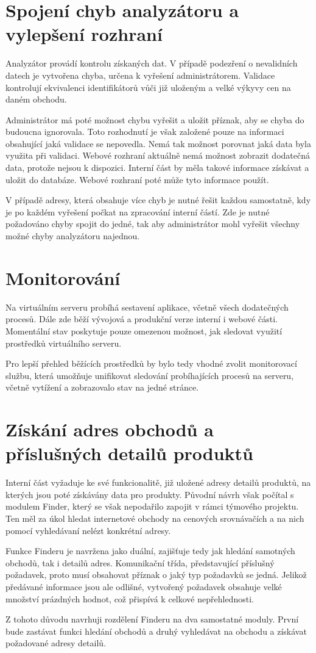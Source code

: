 \documentclass[thesis=B,czech]{FITthesis}[2012/06/26]
\begin{document}
\section{Spojení chyb analyzátoru a vylepšení rozhraní} \label{analyser-join}
Analyzátor provádí kontrolu získaných dat. V případě podezření o nevalidních datech je vytvořena chyba, určena k vyřešení
administrátorem. Validace kontrolují ekvivalenci identifikátorů vůči již uloženým a velké výkyvy cen na daném obchodu.
\par
Administrátor má poté možnost chybu vyřešit a uložit příznak, aby se chyba do budoucna ignorovala. Toto rozhodnutí je však
založené pouze na informaci obsahující jaká validace se nepovedla. Nemá tak možnost porovnat jaká data byla využita při validaci.
Webové rozhraní aktuálně nemá možnost zobrazit dodatečná data, protože nejsou k dispozici. Interní část by měla takové informace
získávat a uložit do databáze. Webové rozhraní poté může tyto informace použít.
\par
V případě adresy, která obsahuje více chyb je nutné řešit každou samostatně, kdy je po každém vyřešení počkat na zpracování interní částí.
Zde je nutné požadováno chyby spojit do jedné, tak aby administrátor mohl vyřešit všechny možné chyby analyzátoru najednou.
\section{Monitorování}
Na virtuálním serveru probíhá sestavení aplikace, včetně všech dodatečných procesů. Dále zde běží vývojová a produkční verze interní i webové části.
Momentální stav poskytuje pouze omezenou možnost, jak sledovat využití prostředků virtuálního serveru.
\par
Pro lepší přehled běžících prostředků by bylo tedy vhodné zvolit monitorovací službu, která umožňuje unifikovat sledování
probíhajících procesů na serveru, včetně vytížení a zobrazovalo stav na jedné stránce.

\section{Získání adres obchodů a příslušných detailů produktů}
Interní část vyžaduje ke své funkcionalitě, již uložené adresy detailů produktů, na kterých jsou poté získávány data pro produkty.
Původní návrh však počítal s modulem Finder, který se však nepodařilo zapojit v rámci týmového projektu. Ten 
měl za úkol hledat internetové obchody na cenových srovnávačích a na nich pomocí vyhledávaní nelézt konkrétní adresy.
\par
Funkce Finderu je navržena jako duální, zajišťuje tedy jak hledání samotných obchodů, tak i detailů adres. Komunikační třída, představující příslušný požadavek, proto musí obsahovat příznak o jaký typ požadavků se jedná. Jelikož předávané informace
jsou ale odlišné, vytvořený požadavek obsahuje velké množství prázdných hodnot, což přispívá k celkové nepřehlednosti.
\par
Z tohoto důvodu navrhuji rozdělení Finderu na dva samostatné moduly. První bude zastávat funkci hledání obchodů a druhý
vyhledávat na obchodu a získávat požadované adresy detailů.
\end{document}
